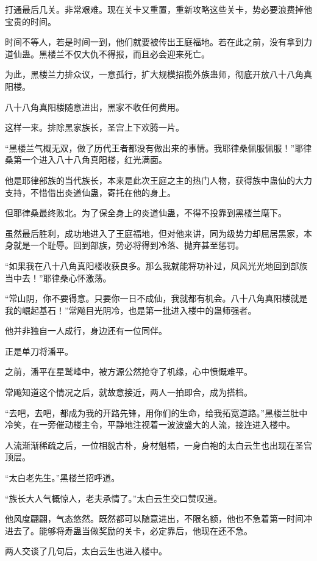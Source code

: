 \begin{this_body}
打通最后几关。非常艰难。现在关卡又重置，重新攻略这些关卡，势必要浪费掉他宝贵的时间。

时间不等人，若是时间一到，他们就要被传出王庭福地。若在此之前，没有拿到力道仙蛊。黑楼兰不仅大仇不得报，而且必会迎来死亡。

为此，黑楼兰力排众议，一意孤行，扩大规模招揽外族蛊师，彻底开放八十八角真阳楼。

八十八角真阳楼随意进出，黑家不收任何费用。

这样一来。排除黑家族长，圣宫上下欢腾一片。

“黑楼兰气概无双，做了历代王者都没有做出来的事情。我耶律桑佩服佩服！”耶律桑第一个进入八十八角真阳楼，红光满面。

他是耶律部族的当代族长，本来是此次王庭之主的热门人物，获得族中蛊仙的大力支持，不惜借出炎道仙蛊，寄托在他的身上。

但耶律桑最终败北。为了保全身上的炎道仙蛊，不得不投靠到黑楼兰麾下。

虽然最后胜利，成功地进入了王庭福地，但对他来讲，同为级势力却屈居黑家，本身就是一个耻辱。回到部族，势必将得到冷落、抛弃甚至惩罚。

“如果我在八十八角真阳楼收获良多。那么我就能将功补过，风风光光地回到部族当中去！”耶律桑心怀激荡。

“常山阴，你不要得意。只要你一日不成仙，我就都有机会。八十八角真阳楼就是我的崛起基石！”常飚目光阴冷，也是第一批进入楼中的蛊师强者。

他并非独自一人成行，身边还有一位同伴。

正是单刀将潘平。

之前，潘平在星鹫峰中，被方源公然抢夺了机缘，心中愤慨难平。

常飚知道这个情况之后，就故意接近，两人一拍即合，成为搭档。

“去吧，去吧，都成为我的开路先锋，用你们的生命，给我拓宽道路。”黑楼兰肚中冷笑，在一旁催动楼主令，平静地注视着一波波盛大的人流，接连进入楼中。

人流渐渐稀疏之后，一位相貌古朴，身材魁梧，一身白袍的太白云生也出现在圣宫顶层。

“太白老先生。”黑楼兰招呼道。

“族长大人气概惊人，老夫承情了。”太白云生交口赞叹道。

他风度翩翩，气态悠然。既然都可以随意进出，不限名额，他也不急着第一时间冲进去了。能够将寿蛊当做奖励的关卡，必定靠后，他现在还不急。

两人交谈了几句后，太白云生也进入楼中。


\end{this_body}
